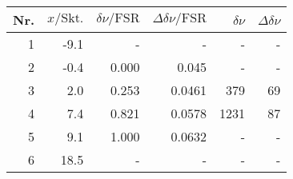 \begin{tabular}{rrrrrr}
\toprule
Nr. & $x/\mathrm{Skt.}$ & $\delta\nu/\mathrm{FSR}$ & $\Delta\delta\nu/\mathrm{FSR}$ & $\delta\nu$ & $\Delta\delta\nu$ \\
\midrule
1 & -9.1 & - & - & - & - \\
2 & -0.4 & 0.000 & 0.045 & - & - \\
3 & 2.0 & 0.253 & 0.0461 & 379 & 69 \\
4 & 7.4 & 0.821 & 0.0578 & 1231 & 87 \\
5 & 9.1 & 1.000 & 0.0632 & - & - \\
6 & 18.5 & - & - & - & - \\
\bottomrule
\end{tabular}
